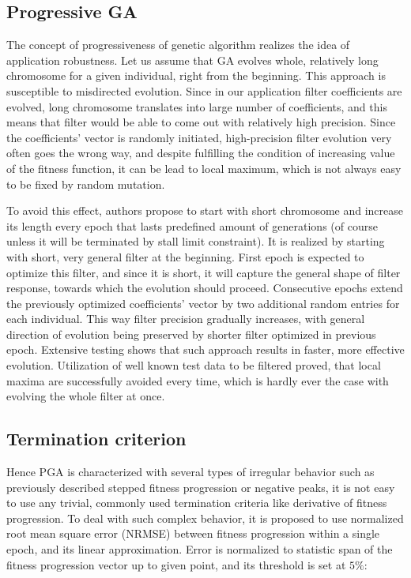 \documentclass[preprint,12pt]{elsarticle}
\begin{document}
\subsection{Progressive GA} \label{pga}

The concept of progressiveness of genetic algorithm realizes the idea of application robustness.  Let us assume that GA evolves whole, relatively long chromosome for a given individual, right from the beginning. This approach is susceptible to misdirected evolution. Since in our application filter coefficients are evolved, long chromosome translates into large number of coefficients, and this means that filter would be able to come out with relatively high precision. Since the coefficients’ vector is randomly initiated, high-precision filter evolution very often goes the wrong way, and despite fulfilling the condition of increasing value of the fitness function, it can be lead to local maximum, which is not always easy to be fixed by random mutation. 

To avoid this effect, authors propose to start with short chromosome and increase its length every epoch that lasts predefined amount of generations (of course unless it will be terminated by stall limit constraint). It is realized by starting with short, very general filter at the beginning. First epoch is expected to optimize this filter, and since it is short, it will capture the general shape of filter response, towards which the evolution should proceed. Consecutive epochs extend the previously optimized coefficients’ vector by two additional random entries for each individual. This way filter precision gradually increases, with general direction of evolution being preserved by shorter filter optimized in previous epoch.
Extensive testing shows that such approach results in faster, more effective evolution. Utilization of well known test data to be filtered proved, that local maxima are successfully avoided every time, which is hardly ever the case with evolving the whole filter at once.

\subsection{Termination criterion}

Hence PGA is characterized with several types of irregular behavior such as previously described stepped fitness progression or negative peaks, it is not easy to use any trivial, commonly used termination criteria like derivative of fitness progression. To deal with such complex behavior, it is proposed to use normalized root mean square error (NRMSE) between fitness progression within a single epoch, and its linear approximation. Error is normalized to statistic span of the fitness progression vector up to given point, and its threshold is set at $5\%$:
\end{document}
